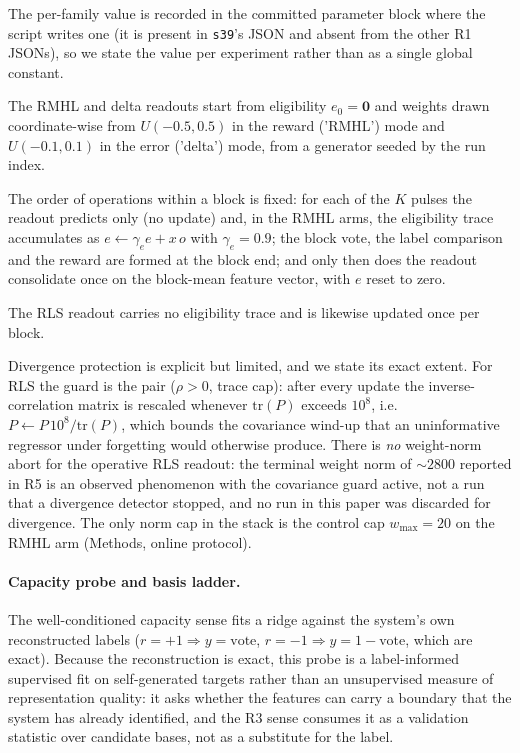 \documentclass[preprint,12pt]{elsarticle}
\begin{document}
The
per-family value is recorded in the
committed parameter block where the script writes one (it is present in
\texttt{s39}'s JSON and absent from the other R1 JSONs), so we state the value
per experiment rather than as a single global constant.

The RMHL and delta
readouts start from eligibility $e_0=\mathbf 0$ and weights drawn
coordinate-wise from $U(-0.5,0.5)$ in the reward ('RMHL') mode and
$U(-0.1,0.1)$ in the error ('delta') mode, from a generator seeded by the run
index.

The order of operations within a block is fixed: for each of the $K$
pulses the readout predicts only (no update) and, in the RMHL arms, the
eligibility trace accumulates as $e\leftarrow\gamma_e e+x\,o$ with
$\gamma_e=0.9$; the block vote, the label comparison and the reward are formed
at the block end; and only then does the readout consolidate once on the
block-mean feature vector, with $e$ reset to zero.

The RLS readout carries no
eligibility trace and is likewise updated once per block.

Divergence
protection is explicit but limited, and we state its exact extent. For RLS the
guard is the pair ($\rho>0$, trace cap): after every update the
inverse-correlation matrix is rescaled whenever $\mathrm{tr}(P)$ exceeds
$10^{8}$, i.e.\ $P\leftarrow P\,10^{8}/\mathrm{tr}(P)$, which bounds the
covariance wind-up that an uninformative regressor under forgetting would
otherwise produce. There is \emph{no} weight-norm abort for the operative RLS
readout: the terminal weight norm of $\sim2800$ reported in R5 is an observed
phenomenon with the covariance guard active, not a run that a divergence
detector stopped, and no run in this paper was discarded for divergence. The
only norm cap in the stack is the control cap $w_{\max}=20$ on the RMHL arm
(Methods, online protocol).

\paragraph{Capacity probe and basis ladder.} The well-conditioned capacity
sense fits a ridge against the system's own reconstructed labels
($r=+1\Rightarrow y=\mathrm{vote}$, $r=-1\Rightarrow y=1-\mathrm{vote}$,
which are exact). Because the reconstruction is exact, this probe is a
label-informed supervised fit on self-generated targets rather than an
unsupervised measure of representation quality: it asks whether the features
can carry a boundary that the system has already identified, and the R3
sense consumes it as a validation statistic over candidate bases, not as a
substitute for the label.
\end{document}
